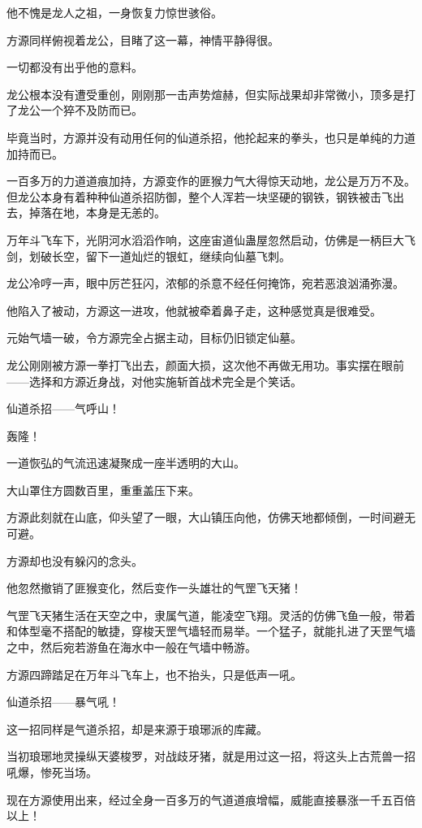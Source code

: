 \begin{this_body}
他不愧是龙人之祖，一身恢复力惊世骇俗。

方源同样俯视着龙公，目睹了这一幕，神情平静得很。

一切都没有出乎他的意料。

龙公根本没有遭受重创，刚刚那一击声势煊赫，但实际战果却非常微小，顶多是打了龙公一个猝不及防而已。

毕竟当时，方源并没有动用任何的仙道杀招，他抡起来的拳头，也只是单纯的力道加持而已。

一百多万的力道道痕加持，方源变作的匪猴力气大得惊天动地，龙公是万万不及。但龙公本身有着种种仙道杀招防御，整个人浑若一块坚硬的钢铁，钢铁被击飞出去，掉落在地，本身是无恙的。

万年斗飞车下，光阴河水滔滔作响，这座宙道仙蛊屋忽然启动，仿佛是一柄巨大飞剑，划破长空，留下一道灿烂的银虹，继续向仙墓飞刺。

龙公冷哼一声，眼中厉芒狂闪，浓郁的杀意不经任何掩饰，宛若恶浪汹涌弥漫。

他陷入了被动，方源这一进攻，他就被牵着鼻子走，这种感觉真是很难受。

元始气墙一破，令方源完全占据主动，目标仍旧锁定仙墓。

龙公刚刚被方源一拳打飞出去，颜面大损，这次他不再做无用功。事实摆在眼前——选择和方源近身战，对他实施斩首战术完全是个笑话。

仙道杀招——气呼山！

轰隆！

一道恢弘的气流迅速凝聚成一座半透明的大山。

大山罩住方圆数百里，重重盖压下来。

方源此刻就在山底，仰头望了一眼，大山镇压向他，仿佛天地都倾倒，一时间避无可避。

方源却也没有躲闪的念头。

他忽然撤销了匪猴变化，然后变作一头雄壮的气罡飞天猪！

气罡飞天猪生活在天空之中，隶属气道，能凌空飞翔。灵活的仿佛飞鱼一般，带着和体型毫不搭配的敏捷，穿梭天罡气墙轻而易举。一个猛子，就能扎进了天罡气墙之中，然后宛若游鱼在海水中一般在气墙中畅游。

方源四蹄踏足在万年斗飞车上，也不抬头，只是低声一吼。

仙道杀招——暴气吼！

这一招同样是气道杀招，却是来源于琅琊派的库藏。

当初琅琊地灵操纵天婆梭罗，对战歧牙猪，就是用过这一招，将这头上古荒兽一招吼爆，惨死当场。

现在方源使用出来，经过全身一百多万的气道道痕增幅，威能直接暴涨一千五百倍以上！


\end{this_body}
